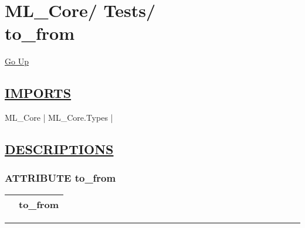 \chapter*{\color{headfile}
{\large ML\_Core\slash\hspace{0pt}}
{\large Tests\slash\hspace{0pt}}
 \\
to_from
}
\hypertarget{ecldoc:toc:ML_Core.Tests.to_from}{}
\hyperlink{ecldoc:toc:root/ML_Core/Tests}{Go Up}

\section*{\underline{\textsf{IMPORTS}}}
\begin{doublespace}
{\large
ML\_Core |
ML\_Core.Types |
}
\end{doublespace}

\section*{\underline{\textsf{DESCRIPTIONS}}}
\subsection*{\textsf{\colorbox{headtoc}{\color{white} ATTRIBUTE}
to\_from}}

\hypertarget{ecldoc:ml_core.tests.to_from}{}

{\renewcommand{\arraystretch}{1.5}
\begin{tabularx}{\textwidth}{|>{\raggedright\arraybackslash}l|X|}
\hline
\hspace{0pt}\mytexttt{\color{red} } & \textbf{to\_from} \\
\hline
\end{tabularx}
}

\par


\rule{\linewidth}{0.5pt}
